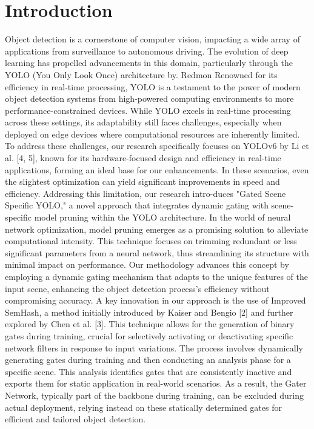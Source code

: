 \documentclass[runningheads]{llncs}
\begin{document}
\section{Introduction}
Object detection is a cornerstone of computer vision, impacting a wide array of applications from surveillance to autonomous driving. The evolution of deep learning has propelled advancements in this domain, particularly through the YOLO (You Only Look Once) architecture by. Redmon \cite{redmon2016you} Renowned for its efficiency in real-time processing, YOLO is a testament to the power of modern object detection systems from high-powered computing environments to more performance-constrained devices. While YOLO excels in real-time processing across these settings, its adaptability still faces challenges, especially when deployed on edge devices where computational resources are inherently limited. To address these challenges, our research specifically focuses on YOLOv6 by Li et al. [4, 5], known for its hardware-focused design and efficiency in real-time applications, forming an ideal base for our enhancements. In these scenarios, even the slightest optimization can yield significant improvements in speed and efficiency. Addressing this limitation, our research intro-duces "Gated Scene Specific YOLO," a novel approach that integrates dynamic gating with scene-specific model pruning within the YOLO architecture.
In the world of neural network optimization, model pruning emerges as a promising solution to alleviate computational intensity. This technique focuses on trimming redundant or less significant parameters from a neural network, thus streamlining its structure with minimal impact on performance. Our methodology advances this concept by employing a dynamic gating mechanism that adapts to the unique features of the input scene, enhancing the object detection process's efficiency without compromising accuracy.
A key innovation in our approach is the use of Improved SemHash, a method initially introduced by Kaiser and Bengio [2] and further explored by Chen et al. [3]. This technique allows for the generation of binary gates during training, crucial for selectively activating or deactivating specific network filters in response to input variations. The process involves dynamically generating gates during training and then conducting an analysis phase for a specific scene. This analysis identifies gates that are consistently inactive and exports them for static application in real-world scenarios. As a result, the Gater Network, typically part of the backbone during training, can be excluded during actual deployment, relying instead on these statically determined gates for efficient and tailored object detection.
\end{document}
